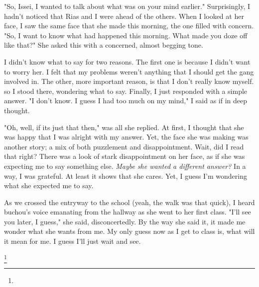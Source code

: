 \documentclass{article}
\begin{document}
"So, Issei, I wanted to talk about what was on your mind earlier." Surprisingly, I hadn't noticed that Rias and I were ahead of the others. When I looked at her face, I saw the same face that she made this morning, the one filled with concern. "So, I want to know what had happened this morning. What made you doze off like that?" She asked this with a concerned, almost begging tone.

I didn't know what to say for two reasons. The first one is because I didn't want to worry her. I felt that my problems weren't anything that I should get the gang involved in. The other, more important reason, is that I don't really know myself. so I stood there, wondering what to say. Finally, I just responded with a simple answer. "I don't know. I guess I had too much on my mind," I said as if in deep thought.

"Oh, well, if its just that then," was all she replied. At first, I thought that she was happy that I was alright with my answer. Yet, the face she was making was another story; a mix of both puzzlement and disappointment. Wait, did I read that right? There was a look of stark disappointment on her face, as if she was expecting me to say something else. \emph{Maybe she wanted a different answer?} In a way, I was grateful. At least it shows that she cares. Yet, I guess I'm wondering what she expected me to say.

As we crossed the entryway to the school (yeah, the walk was that quick), I heard buchou's voice emanating from the hallway as she went to her first class. "I'll see you later, I guess," she said, disconcertedly. By the way she said it, it made me wonder what she wants from me. My only guess now as I get to class is, what will it mean for me. I guess I'll just wait and see.

\footnote{}
\end{document}
